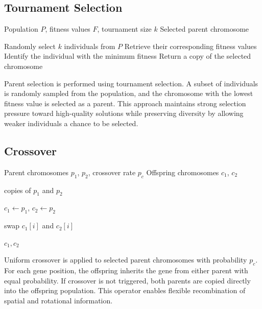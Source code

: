\documentclass{article}
\begin{document}
\subsection{Tournament Selection}
\begin{algorithm}[H]
\caption{Tournament Selection}
\label{alg:tournament}
\begin{algorithmic}[1]
\Require Population $P$, fitness values $F$, tournament size $k$
\Ensure Selected parent chromosome

\State Randomly select $k$ individuals from $P$
\State Retrieve their corresponding fitness values
\State Identify the individual with the minimum fitness
\State Return a copy of the selected chromosome

\end{algorithmic}
\end{algorithm}
Parent selection is performed using tournament selection. A subset of individuals is randomly sampled from the population, and the chromosome with the lowest fitness value is selected as a parent. This approach maintains strong selection pressure toward high-quality solutions while preserving diversity by allowing weaker individuals a chance to be selected.

\subsection{Crossover}
\begin{algorithm}[H]
\caption{Uniform Crossover}
\label{alg:crossover}
\begin{algorithmic}[1]
\Require Parent chromosomes $p_1$, $p_2$, crossover rate $p_c$
\Ensure Offspring chromosomes $c_1$, $c_2$

    \State \Return copies of $p_1$ and $p_2$
\EndIf

\State $c_1 \gets p_1$, $c_2 \gets p_2$

        \State swap $c_1[i]$ and $c_2[i]$
    \EndIf
\EndFor

\State \Return $c_1, c_2$
\end{algorithmic}
\end{algorithm}
Uniform crossover is applied to selected parent chromosomes with probability $p_c$. For each gene position, the offspring inherits the gene from either parent with equal probability. If crossover is not triggered, both parents are copied directly into the offspring population. This operator enables flexible recombination of spatial and rotational information.
\end{document}
